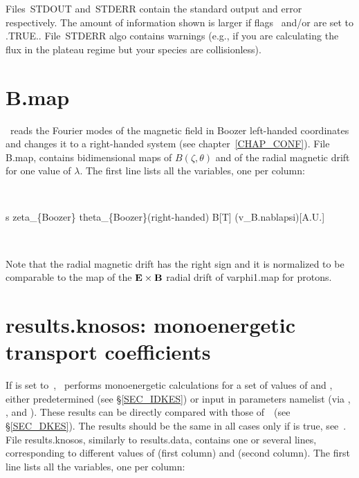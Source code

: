 Files~{\ttfamily STDOUT} and~{\ttfamily STDERR} contain the standard output and error respectively. The amount of information shown is larger if flags~ and/or  are set to {\ttfamily .TRUE.}. File~{\ttfamily STDERR} algo contains warnings (e.g., if you are calculating the flux in the plateau regime but your species are collisionless).


\section{{\ttfamily B.map}}

\KNOSOS~reads the Fourier modes of the magnetic field in Boozer left-handed coordinates and changes it to a right-handed system (see chapter~\ref{CHAP_CONF}). File {\ttfamily B.map}, contains bidimensional maps of $B(\zeta,\theta)$ and of the radial magnetic drift for one value of $\lambda$. The first line lists all the variables, one per column:

\

{\ttfamily s \tbl zeta\_\{Boozer\} \tbl theta\_\{Boozer\}(right-handed)  B[T]  (v\_B.\tbl nabla\tbl psi)[A.U.]}

\

Note that the radial magnetic drift has the right sign and it is normalized to be comparable to the map of the $\mathbf{E}\times\mathbf{B}$ radial drift of {\ttfamily varphi1.map} for protons.



\section{{\ttfamily results.knosos}: monoenergetic transport coefficients}\label{SEC_ODKES}

If  is set to~\true, \KNOSOS~performs monoenergetic calculations for a set of values of  and , either predetermined (see \S\ref{SEC_IDKES}) or input in {\ttfamily parameters} namelist (via , ,  and ). These results can be directly compared with those of~\DKES~(see \S\ref{SEC_DKES}). The results should be the same in all cases only if  is true, see~\cite{beidler2007icnts}. File {\ttfamily results.knosos}, similarly to {\ttfamily results.data}, contains one or several lines, corresponding to different values of  (first column) and  (second column). The first line lists all the variables, one per column:

